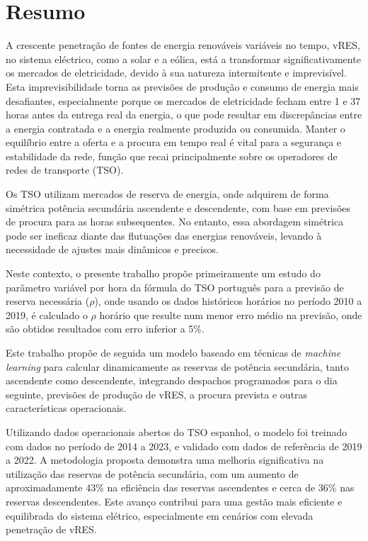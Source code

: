 \chapter{Resumo}
\justifying

A crescente penetração de fontes de energia renováveis variáveis no tempo, \gls{vRES}, no sistema eléctrico, como a solar e a eólica, está a transformar significativamente os mercados de eletricidade, devido à sua natureza intermitente e imprevisível. Esta imprevisibilidade torna as previsões de produção e consumo de energia mais desafiantes, especialmente porque os mercados de eletricidade fecham entre 1 e 37 horas antes da entrega real da energia, o que pode resultar em discrepâncias entre a energia contratada e a energia realmente produzida ou consumida. Manter o equilíbrio entre a oferta e a procura em tempo real é vital para a segurança e estabilidade da rede, função que recai principalmente sobre os operadores de redes de transporte (\gls{TSO}).\par
Os \gls{TSO} utilizam mercados de reserva de energia, onde adquirem de forma simétrica potência secundária ascendente e descendente, com base em previsões de procura para as horas subsequentes. No entanto, essa abordagem simétrica pode ser ineficaz diante das flutuações das energias renováveis, levando à necessidade de ajustes mais dinâmicos e precisos.\par
Neste contexto, o presente trabalho propõe primeiramente um estudo do parâmetro variável por hora da fórmula do \gls{TSO} português para a previsão de reserva necessária ($\rho$), onde usando os dados históricos horários no período 2010 a 2019, é calculado o $\rho$ horário que resulte num menor erro médio na previsão, onde são obtidos resultados com erro inferior a 5\%.\par
Este trabalho propõe de seguida um modelo baseado em técnicas de \textit{machine learning} para calcular dinamicamente as reservas de potência secundária, tanto ascendente como descendente, integrando despachos programados para o dia seguinte, previsões de produção de \gls{vRES}, a procura prevista e outras características operacionais.\par
Utilizando dados operacionais abertos do \gls{TSO} espanhol, o modelo foi treinado com dados no período de 2014 a 2023,  e validado com dados de referência de 2019 a 2022. A metodologia proposta demonstra uma melhoria significativa na utilização das reservas de potência secundária, com um aumento de aproximadamente 43\% na eficiência das reservas ascendentes e cerca de 36\% nas reservas descendentes. Este avanço contribui para uma gestão mais eficiente e equilibrada do sistema elétrico, especialmente em cenários com elevada penetração de \gls{vRES}.\par




\vspace{0.5cm} %


